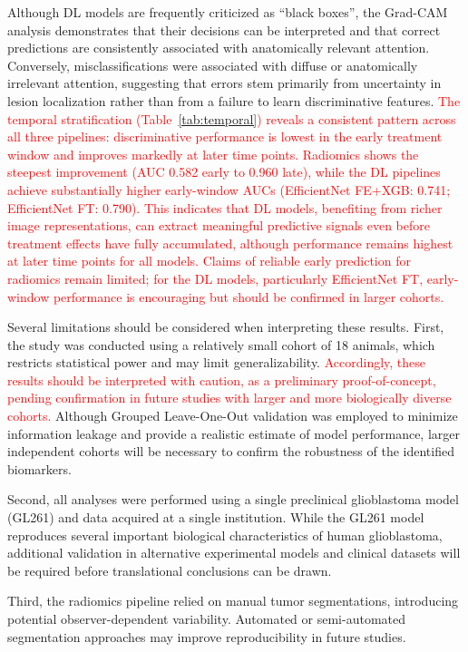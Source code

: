 \documentclass{article}
\begin{document}
Although DL models are frequently criticized as ``black boxes'', the Grad-CAM analysis demonstrates that their decisions can be interpreted and that correct predictions are consistently associated with anatomically relevant attention. Conversely, misclassifications were associated with diffuse or anatomically irrelevant attention, suggesting that errors stem primarily from uncertainty in lesion localization rather than from a failure to learn discriminative features. \textcolor{red}{The temporal stratification (Table~\ref{tab:temporal}) reveals a consistent pattern across all three pipelines: discriminative performance is lowest in the early treatment window and improves markedly at later time points. Radiomics shows the steepest improvement (AUC 0.582 early to 0.960 late), while the DL pipelines achieve substantially higher early-window AUCs (EfficientNet FE+XGB: 0.741; EfficientNet FT: 0.790). This indicates that DL models, benefiting from richer image representations, can extract meaningful predictive signals even before treatment effects have fully accumulated, although performance remains highest at later time points for all models. Claims of reliable early prediction for radiomics remain limited; for the DL models, particularly EfficientNet FT, early-window performance is encouraging but should be confirmed in larger cohorts.}

Several limitations should be considered when interpreting these results. First, the study was conducted using a relatively small cohort of 18 animals, which restricts statistical power and may limit generalizability. \textcolor{red}{Accordingly, these results should be interpreted with caution, as a preliminary proof-of-concept, pending confirmation in future studies with larger and more biologically diverse cohorts.} Although Grouped Leave-One-Out validation was employed to minimize information leakage and provide a realistic estimate of model performance, larger independent cohorts will be necessary to confirm the robustness of the identified biomarkers.

Second, all analyses were performed using a single preclinical glioblastoma model (GL261) and data acquired at a single institution. While the GL261 model reproduces several important biological characteristics of human glioblastoma, additional validation in alternative experimental models and clinical datasets will be required before translational conclusions can be drawn.

Third, the radiomics pipeline relied on manual tumor segmentations, introducing potential observer-dependent variability. Automated or semi-automated segmentation approaches may improve reproducibility in future studies.
\end{document}
